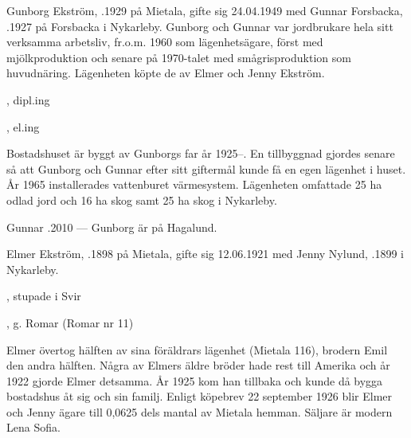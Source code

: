
%
Gunborg Ekström, .1929 på Mietala, gifte sig 24.04.1949 med Gunnar Forsbacka, .1927 på Forsbacka i Nykarleby. Gunborg och Gunnar var jordbrukare hela sitt verksamma arbetsliv, fr.o.m. 1960 som lägenhetsägare, först med mjölkproduktion och senare på 1970-talet med smågrisproduktion som huvudnäring. Lägenheten köpte de av Elmer och Jenny Ekström.
\begin{jhchildren}
  \item {}, dipl.ing
  \item {}, el.ing
\end{jhchildren}

Bostadshuset är byggt av Gunborgs far år 1925--. En tillbyggnad gjordes senare så att Gunborg och Gunnar efter sitt
giftermål kunde få en egen lägenhet i huset. År 1965 installerades vattenburet värmesystem. Lägenheten omfattade 25 ha odlad jord och 16 ha skog samt 25 ha skog i Nykarleby.

Gunnar .2010  ---  Gunborg är på Hagalund.


%
Elmer Ekström, .1898 på Mietala, gifte sig 12.06.1921 med Jenny Nylund, .1899 i Nykarleby.
\begin{jhchildren}
  \item {}, stupade i Svir
  \item {}
  \item {}, g. Romar (Romar nr 11)
\end{jhchildren}

Elmer övertog hälften av sina föräldrars lägenhet (Mietala 116), brodern Emil den andra hälften. Några av Elmers äldre bröder hade rest till  Amerika och år 1922 gjorde Elmer detsamma. År 1925 kom han tillbaka och kunde då bygga bostadshus åt sig och sin familj. Enligt köpebrev 22 september 1926 blir Elmer och Jenny ägare till 0,0625 dels mantal av Mietala hemman. Säljare är modern Lena Sofia.

